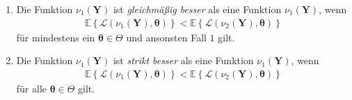 \documentclass[12pt, a4paper]{report}\usepackage[]{graphicx}\usepackage[]{color}
\begin{document}
\begin{appendix}
\begin{enumerate}
\item Die Funktion $\nu_1(\mathbf{Y})$ ist \textit{gleichmäßig besser} als eine Funktion $\nu_1(\mathbf{Y})$, wenn
\begin{align*}
\mathbb{E} \left\lbrace \mathscr{L}(\nu_1(\mathbf{Y}),\boldsymbol{\theta}) \right\rbrace < \mathbb{E} \left\lbrace \mathscr{L}(\nu_2(\mathbf{Y}),\boldsymbol{\theta}) \right\rbrace
\end{align*}
für mindestens ein $\boldsymbol{\theta} \in \Theta$ und ansonsten Fall $1$ gilt.

\item Die Funktion $\nu_1(\mathbf{Y})$ ist \textit{strikt besser} als eine Funktion $\nu_1(\mathbf{Y})$, wenn
\begin{align*}
\mathbb{E} \left\lbrace \mathscr{L}(\nu_1(\mathbf{Y}),\boldsymbol{\theta}) \right\rbrace < \mathbb{E} \left\lbrace \mathscr{L}(\nu_2(\mathbf{Y}),\boldsymbol{\theta}) \right\rbrace
\end{align*}
für alle $\boldsymbol{\theta} \in \Theta$ gilt.
\end{enumerate}


\end{appendix}
\end{document}

